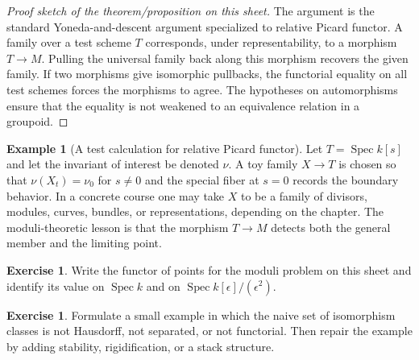 \documentclass[11pt]{amsart}
\theoremstyle{definition}
\newtheorem{example}[theorem]{Example}
\newtheorem{exercise}[theorem]{Exercise}
\newcommand{\Spec}{\operatorname{Spec}}
\begin{document}
\begin{proof}[Proof sketch of the theorem/proposition on this sheet]
The argument is the standard Yoneda-and-descent argument specialized to relative Picard functor.  A family over a test scheme $T$ corresponds, under representability, to a morphism $T\to M$.  Pulling the universal family back along this morphism recovers the given family.  If two morphisms give isomorphic pullbacks, the functorial equality on all test schemes forces the morphisms to agree.  The hypotheses on automorphisms ensure that the equality is not weakened to an equivalence relation in a groupoid.
\end{proof}
\begin{example}[A test calculation for relative Picard functor]
Let $T=\Spec k[s]$ and let the invariant of interest be denoted $\nu$.  A toy family $X\to T$ is chosen so that $\nu(X_t)=\nu_0$ for $s\ne0$ and the special fiber at $s=0$ records the boundary behavior.  In a concrete course one may take $X$ to be a family of divisors, modules, curves, bundles, or representations, depending on the chapter.  The moduli-theoretic lesson is that the morphism $T\to M$ detects both the general member and the limiting point.
\end{example}
\begin{exercise}
Write the functor of points for the moduli problem on this sheet and identify its value on $\Spec k$ and on $\Spec k[\epsilon]/(\epsilon^2)$.
\end{exercise}
\begin{exercise}
Formulate a small example in which the naive set of isomorphism classes is not Hausdorff, not separated, or not functorial.  Then repair the example by adding stability, rigidification, or a stack structure.
\end{exercise}
\clearpage
\end{document}
